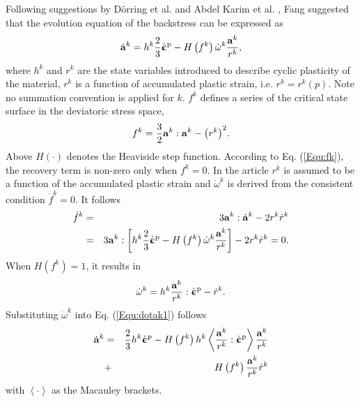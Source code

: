 \documentclass[preprint,5p,twocolumn,11pt,sort&compress]{elsarticle}
\newcommand{\dotbfepsilon}{{\dot{\bm{\upepsilon}}}}
\newcommand{\bfa}{{\bf a}}
\begin{document}
Following suggestions by D\"orring et al. \cite{Doerring2003} and Abdel Karim et al. \cite{AbdelKarim20051303}, Fang \cite{fang2015cyclic} suggested that the evolution equation of the backstress can be expressed as
\begin{equation}
\label{Equ:dotak1}
{\dot\bfa^k} = {h^k}\frac{2}{3}{\dotbfepsilon^{\rm p}} - H\left( {{f^k}} \right){\dot \omega ^k}\frac{{{\bfa^k}}}{{{r^k}}},
\end{equation}
where ${h^k} $ and ${r^k} $ are the state variables introduced to describe cyclic plasticity of the material, $r^k$ is a function of accumulated plastic strain, i.e. ${r^k} = {r^k}\left( p \right)$.  Note no summation convention is applied for $k$. ${f^k} $ defines a series of the critical state surface in the deviatoric stress space,
\begin{equation}
\label{Equ:fk}
{f^k} = \frac{3}{2}{\bfa^k}:{\bfa^k} - {\left( {{r^k}} \right)^2}.
\end{equation}
Above  $H(\cdot)$ denotes the Heaviside step function. According to Eq. (\ref{Equ:fk}), the recovery term is non-zero only when ${f^k} = 0$. In the article $r^k$ is assumed to be a function of the accumulated plastic strain and ${\dot \omega ^k}$ is derived from the consistent condition ${\dot f^k} = 0$. It follows
\begin{eqnarray}
\label{Equ:dotfk}
{\dot f^k} &=& 3{\bfa^k}:{\dot\bfa^k} - 2{r^k}{\dot r^k} \\ \nonumber
&=& 3{\bfa^k}:\left[ {{h^k}\frac{2}{3}{{\dotbfepsilon}^{\rm p}} - H\left( {{f^k}} \right){{\dot \omega }^k}\frac{{{\bfa^k}}}{{{r^k}}}} \right] - 2{r^k}{\dot r^k} = 0.
\end{eqnarray}
When $H\left( {{f^k}} \right) = 1$, it results in
\begin{equation}
\label{Equ:dotomegak}
{\dot \omega ^k} = {h^k}\frac{{{\bfa^k}}}{{{r^k}}}:{\dotbfepsilon^{\rm p}} - {\dot r^k}.
\end{equation}
Substituting ${\dot \omega ^k}$ into Eq. (\ref{Equ:dotak1}) follows
\begin{eqnarray}
\label{Equ:dotak2}\nonumber
{\dot\bfa^k} &=& \frac{2}{3}{h^k}{\dotbfepsilon^{\rm p}} - H\left( {{f^k}} \right){h^k}\left\langle {\frac{{{\bfa^k}}}{{{r^k}}}:{{\dotbfepsilon}^{\rm p}}} \right\rangle \frac{{{\bfa^k}}}{{{r^k}}} \\
&+& H\left( {{f^k}} \right)\frac{{{\bfa^k}}}{{{r^k}}}{\dot r^k}
\end{eqnarray}
with $\left<\cdot\right>$ as the Macauley brackets.
\end{document}
